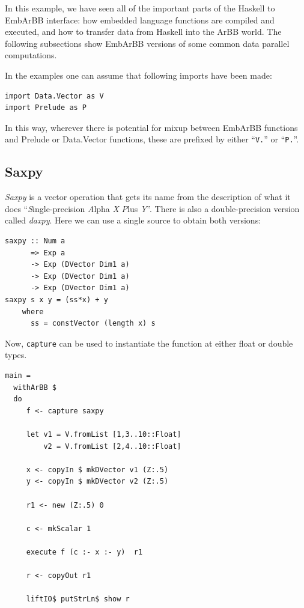 In this example, we have seen all of the important parts of the
Haskell to EmbArBB interface: how embedded language functions are compiled and
executed, and how to transfer data from Haskell into the ArBB world.
The following subsections show EmbArBB versions of some common 
data parallel computations.



In the examples one can assume that following imports have been made: 
\begin{verbatim}
import Data.Vector as V
import Prelude as P
\end{verbatim}
In this way, wherever there is potential for mixup between EmbArBB functions 
and Prelude or Data.Vector functions, these are prefixed by either ``{\tt V.}'' or 
``{\tt P.}''. 

\subsection{Saxpy} 
{\em Saxpy} is a vector operation that gets its name from the 
description of what it does ``{\em S}ingle-precision {\em A}lpha {\em X} {\em P}lus {\em Y}''. 
There is also a double-precision version called {\em daxpy}. Here we can use a single source 
to obtain both versions:

\begin{verbatim} 
saxpy :: Num a 
      => Exp a 
      -> Exp (DVector Dim1 a) 
      -> Exp (DVector Dim1 a) 
      -> Exp (DVector Dim1 a) 
saxpy s x y = (ss*x) + y 
    where 
      ss = constVector (length x) s
\end{verbatim}

Now, {\tt capture} can be used to instantiate the function at either float or double 
types.  

\begin{verbatim}
main = 
  withArBB $ 
  do 
     f <- capture saxpy
     
     let v1 = V.fromList [1,3..10::Float] 
         v2 = V.fromList [2,4..10::Float] 
          
     x <- copyIn $ mkDVector v1 (Z:.5) 
     y <- copyIn $ mkDVector v2 (Z:.5) 
     
     r1 <- new (Z:.5) 0    
           
     c <- mkScalar 1 
     
     execute f (c :- x :- y)  r1
              
     r <- copyOut r1
              
     liftIO$ putStrLn$ show r
\end{verbatim}

